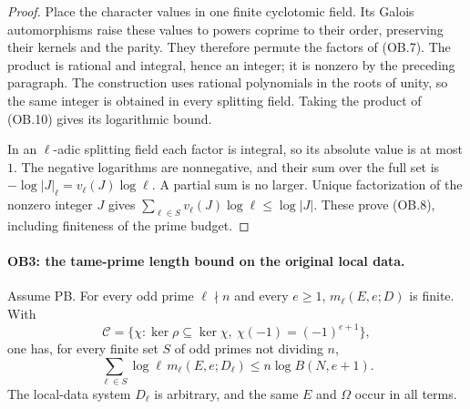 \begin{proof}
Place the character values in one finite cyclotomic field.
Its Galois automorphisms raise these values to powers coprime to
their order, preserving their kernels and the parity.  They
therefore permute the factors of (OB.7).  The product is rational
and integral, hence an integer; it is nonzero by the preceding
paragraph.  The construction uses rational polynomials in the
roots of unity, so the same integer is obtained in every splitting
field.  Taking the product of (OB.10) gives its logarithmic bound.

In an $\ell$-adic splitting field each factor is integral, so its
absolute value is at most $1$.  The negative logarithms are
nonnegative, and their sum over the full set is
$-\log|J|_\ell=v_\ell(J)\log\ell$.  A partial sum is no larger.
Unique factorization of the nonzero integer $J$ gives
$\sum_{\ell\in S}v_\ell(J)\log\ell\le\log|J|$.
These prove (OB.8), including finiteness of the prime budget.
\end{proof}

\paragraph{OB3: the tame-prime length bound on the original local data.}
\label{claim:OB3}
Assume PB.  For every odd prime $\ell\nmid n$ and every $e\ge1$,
$m_\ell(E,e;D)$ is finite.  With
\[
 \mathcal C=\{\chi:\ker\rho\subseteq\ker\chi,
                          \ \chi(-1)=(-1)^{e+1}\},
\]
one has, for every finite set $S$ of odd primes not dividing $n$,
\[
 \sum_{\ell\in S}\log\ell\,m_\ell(E,e;D_\ell)
                \le n\log B(N,e+1).                 \tag{OB.11}
\]
The local-data system $D_\ell$ is arbitrary, and the same $E$ and
$\Omega$ occur in all terms.

